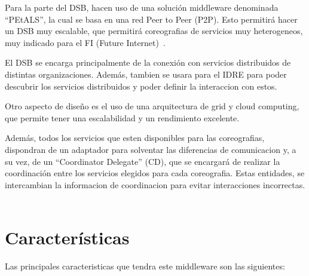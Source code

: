 \documentclass[runningheads]{llncs}
\begin{document}
Para la parte del DSB, hacen uso de una solución middleware denominada ``PEtALS'', la cual se basa en una red Peer to Peer (P2P). Esto permitirá hacer un DSB muy escalable, que permitirá coreografias de servicios muy heterogeneos, muy indicado para el FI (Future Internet)~\cite{a_1}.

El DSB se encarga principalmente de la conexión con servicios distribuidos de distintas organizaciones. Además, tambien se usara para el IDRE para poder descubrir los servicios distribuidos y poder definir la interaccion con estos. ~\cite{a_10}

Otro aspecto de diseño es el uso de una arquitectura de grid y cloud computing, que permite tener una escalabilidad y un rendimiento excelente.

Además, todos los servicios que esten disponibles para las coreografias, dispondran de un adaptador para solventar las diferencias de comunicacion y, a su vez, de un ``Coordinator Delegate'' (CD), que se encargará de realizar la coordinación entre los servicios elegidos para cada coreografia. Estas entidades, se intercambian la informacion de coordinacion para evitar interacciones incorrectas. ~\cite{a_2}

\section{Características}
Las principales caracteristicas que tendra este middleware son las siguientes:
\end{document}
